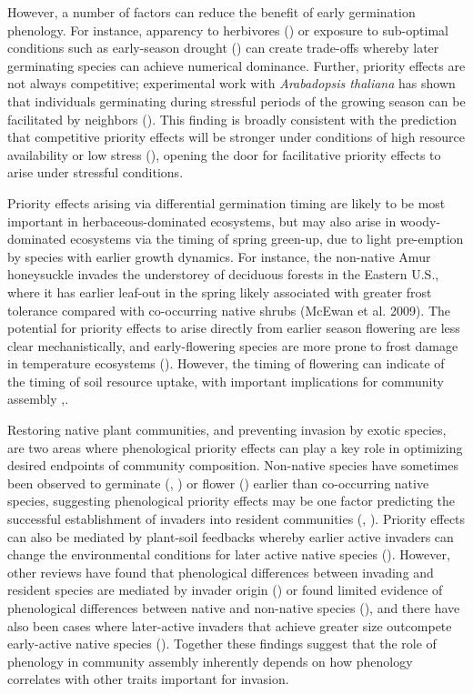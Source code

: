 \documentclass[11pt]{article}
\begin{document}
However, a number of factors can reduce the benefit of early germination phenology. For instance, apparency to herbivores (\citet{waterton2016trade}) or exposure to sub-optimal conditions such as early-season drought (\citet{wainwright2012seasonal})  can create trade-offs whereby later germinating species can achieve numerical dominance. Further, priority effects are not always competitive; experimental work with \textit{Arabadopsis thaliana }has shown that individuals germinating during stressful periods of the growing season can be facilitated by neighbors (\citet{leverett2017germination}). This finding is broadly consistent with the prediction that competitive priority effects will be stronger under conditions of high resource availability or low stress (\citet{vannette2014historical}), opening the door for facilitative priority effects to arise under stressful conditions.

Priority effects arising via differential germination timing are likely to be most important in herbaceous-dominated ecosystems, but may also arise in woody-dominated ecosystems via the timing of spring green-up, due to light pre-emption by species with earlier growth dynamics. For instance, the non-native Amur honeysuckle invades the understorey of deciduous forests in the Eastern U.S., where it has earlier leaf-out in the spring likely associated with greater frost tolerance compared with co-occurring native shrubs (McEwan et al. 2009). The potential for priority effects to arise directly from earlier season flowering are less clear mechanistically, and early-flowering species are more prone to frost damage in temperature ecosystems (\citet{inouye2008effects}). However, the timing of flowering can indicate of the timing of soil resource uptake, with important implications for community assembly \citet{gulmon1983phenology},\citet{seabloom2003invasion}.

Restoring native plant communities, and preventing invasion by exotic species, are two areas where phenological priority effects can play a key role in optimizing desired endpoints of community composition. Non-native species have sometimes been observed to germinate (\citet{wainwright2012seasonal}, \citet{wilsey2011biodiversity}) or flower (\citet{cleland2013strengthening}) earlier than co-occurring native species, suggesting phenological priority effects may be one factor predicting the successful establishment of invaders into resident communities (\citet{wolkovich2011phenology}, \citet{alexander2019earlier}). Priority effects can also be mediated by plant-soil feedbacks whereby earlier active invaders can change the environmental conditions for later active native species (\citet{grman2010within}). However, other reviews have found that phenological differences between invading and resident species are mediated by invader origin (\citet{godoy2009flowering}) or found limited evidence of phenological differences between native and non-native species (\citet{zettlemoyer2022limited}), and there have also been cases where later-active invaders that achieve greater size outcompete early-active native species (\citet{godoy2014}). Together these findings suggest that the role of phenology in community assembly inherently depends on how phenology correlates with other traits important for invasion.
\end{document}
